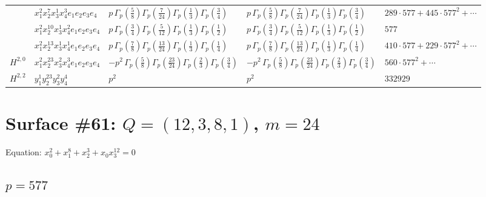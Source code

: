\documentclass[11pt]{article}
\begin{document}
\begin{table}[ht]
{\begin{tabular}{@{}lllll@{}}
 & $x_{1}^{2} x_{2}^{7} x_{3}^{1} x_{4}^{3}  e_{1} e_{2} e_{3} e_{4}$ & $p \, \Gamma_p \left( \frac{5}{8} \right) \Gamma_p \left( \frac{7}{24} \right) \Gamma_p \left( \frac{1}{3} \right) \Gamma_p \left( \frac{3}{4} \right)$ & $p \, \Gamma_p \left( \frac{5}{8} \right) \Gamma_p \left( \frac{7}{24} \right) \Gamma_p \left( \frac{1}{3} \right) \Gamma_p \left( \frac{3}{4} \right)$ & $289{\cdot}577{+}445{\cdot}577^{2}{+}\cdots$ \\
 & $x_{1}^{2} x_{2}^{10} x_{3}^{1} x_{4}^{2}  e_{1} e_{2} e_{3} e_{4}$ & $p \, \Gamma_p \left( \frac{3}{4} \right) \Gamma_p \left( \frac{5}{12} \right) \Gamma_p \left( \frac{1}{3} \right) \Gamma_p \left( \frac{1}{2} \right)$ & $p \, \Gamma_p \left( \frac{3}{4} \right) \Gamma_p \left( \frac{5}{12} \right) \Gamma_p \left( \frac{1}{3} \right) \Gamma_p \left( \frac{1}{2} \right)$ & $577$ \\
 & $x_{1}^{2} x_{2}^{13} x_{3}^{1} x_{4}^{1}  e_{1} e_{2} e_{3} e_{4}$ & $p \, \Gamma_p \left( \frac{7}{8} \right) \Gamma_p \left( \frac{13}{24} \right) \Gamma_p \left( \frac{1}{3} \right) \Gamma_p \left( \frac{1}{4} \right)$ & $p \, \Gamma_p \left( \frac{7}{8} \right) \Gamma_p \left( \frac{13}{24} \right) \Gamma_p \left( \frac{1}{3} \right) \Gamma_p \left( \frac{1}{4} \right)$ & $410{\cdot}577{+}229{\cdot}577^{2}{+}\cdots$ \\
\midrule
$H^{2,0}$ & $x_{1}^{2} x_{2}^{23} x_{3}^{2} x_{4}^{3}  e_{1} e_{2} e_{3} e_{4}$ & $- p^{2} \, \Gamma_p \left( \frac{5}{8} \right) \Gamma_p \left( \frac{23}{24} \right) \Gamma_p \left( \frac{2}{3} \right) \Gamma_p \left( \frac{3}{4} \right)$ & $- p^{2} \, \Gamma_p \left( \frac{5}{8} \right) \Gamma_p \left( \frac{23}{24} \right) \Gamma_p \left( \frac{2}{3} \right) \Gamma_p \left( \frac{3}{4} \right)$ & $560{\cdot}577^{2}{+}\cdots$ \\
\midrule
$H^{2,2}$ & $y_{1}^{1} y_{2}^{23} y_{3}^{2} y_{4}^{4}$ & $p^{2} \,$ & $p^{2} \,$ & $332929$ \\
\bottomrule
\end{tabular}
}
\renewcommand{\arraystretch}{1.0}
\end{table}

\newpage

\section*{Surface \#61: $Q=(12, 3, 8, 1)$, $m=24$}

Equation: $x_0^{2} + x_1^{8} + x_2^{3} + x_0 x_3^{12} = 0$

\subsection*{$p = 577$}
\end{document}
